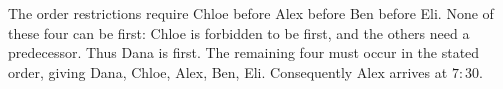 The order restrictions require Chloe before Alex before Ben before Eli. None of these four can be first: Chloe is forbidden to be first, and the others need a predecessor. Thus Dana is first. The remaining four must occur in the stated order, giving Dana, Chloe, Alex, Ben, Eli. Consequently $\boxed{\text{Alex}}$ arrives at $7{:}30$.
